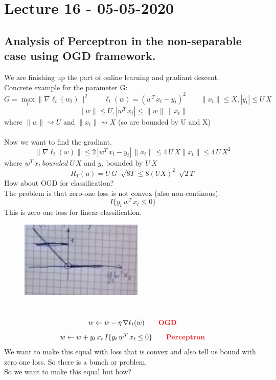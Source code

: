 \documentclass[../main.tex]{subfiles}
\begin{document}
\chapter{Lecture 16 - 05-05-2020}

\section{Analysis of Perceptron in the non-separable case using OGD framework.}
We are finishing up the part of online learning and gradiant descent. \\
Concrete example for the parameter G:
$$
G = \max_t \| \nabla \ell_t(w_t) \|^2 \qquad \ell_t(w) = (w^T \, x_t -y_t)^2 \qquad \|x_t\| \leq X, |y_t| \leq U\, X
$$
$$
\|w\| \leq U, |w^T \, x_t| \leq \| w \| \, \| x_t \|
$$
where $\| w \| \rightsquigarrow U$
and $\|x_t\| \rightsquigarrow X$ (so are bounded by U and X)
\\\\
Now we want to find the gradiant.
\\
$$
\| \nabla \ell_t(w) \| \leq 2 \, | w^T \, x_t - y_t | \, \|x_t \| \leq 4 \, U \, X \| x_t \| \leq 4 \, U \, X^2
$$
where $w^T \, x_t \ bounded \ U \, X$ and $y_t$ bounded by $U \, X$
$$
R_T(u) = U \, G  \ \sqrt[]{8T} \leq 8 (UX)^2 \ \sqrt[]{2 \, T}
$$
How about OGD for classification?\\
The problem is that zero-one loss is not convex (also non-continous).
\\
$$
I \{ y_t \, w^T \, x_t \leq 0 \}
$$
This is zero-one loss for linear classification.
\begin{figure}[h]
    \centering
    \includegraphics[width=0.4\linewidth]{../img/lez16-img1.JPG}
    \caption{}
\end{figure}\\
$$
w \leftarrow w - \eta \, \nabla \ell_t(w) \qquad \bred{OGD}
$$
$$
w \leftarrow w + y_t \, x_t \, I \{ y_t \, w^T \, x_t \leq 0 \} \qquad \bred{Perceptron}
$$
We want to make this equal with loss that is convex and also tell us bound with zero one loss. So there is a bunch or problem.
\\
So we want to make this equal but how? 
\\
\end{document}
